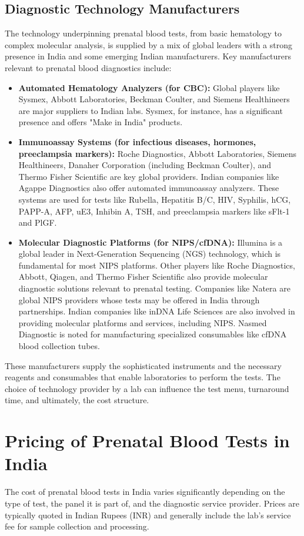 \documentclass{article}
\begin{document}
\subsection{Diagnostic Technology Manufacturers}
The technology underpinning prenatal blood tests, from basic hematology to complex molecular analysis, is supplied by a mix of global leaders with a strong presence in India and some emerging Indian manufacturers. Key manufacturers relevant to prenatal blood diagnostics include:
\begin{itemize}
    \item \textbf{Automated Hematology Analyzers (for CBC):} Global players like Sysmex, Abbott Laboratories, Beckman Coulter, and Siemens Healthineers are major suppliers to Indian labs. Sysmex, for instance, has a significant presence and offers "Make in India" products.
    \item \textbf{Immunoassay Systems (for infectious diseases, hormones, preeclampsia markers):} Roche Diagnostics, Abbott Laboratories, Siemens Healthineers, Danaher Corporation (including Beckman Coulter), and Thermo Fisher Scientific are key global providers. Indian companies like Agappe Diagnostics also offer automated immunoassay analyzers. These systems are used for tests like Rubella, Hepatitis B/C, HIV, Syphilis, hCG, PAPP-A, AFP, uE3, Inhibin A, TSH, and preeclampsia markers like sFlt-1 and PlGF.
    \item \textbf{Molecular Diagnostic Platforms (for NIPS/cfDNA):} Illumina is a global leader in Next-Generation Sequencing (NGS) technology, which is fundamental for most NIPS platforms. Other players like Roche Diagnostics, Abbott, Qiagen, and Thermo Fisher Scientific also provide molecular diagnostic solutions relevant to prenatal testing. Companies like Natera are global NIPS providers whose tests may be offered in India through partnerships. Indian companies like inDNA Life Sciences are also involved in providing molecular platforms and services, including NIPS. Nasmed Diagnostic is noted for manufacturing specialized consumables like cfDNA blood collection tubes.
\end{itemize}
These manufacturers supply the sophisticated instruments and the necessary reagents and consumables that enable laboratories to perform the tests. The choice of technology provider by a lab can influence the test menu, turnaround time, and ultimately, the cost structure.

\section{Pricing of Prenatal Blood Tests in India}
The cost of prenatal blood tests in India varies significantly depending on the type of test, the panel it is part of, and the diagnostic service provider. Prices are typically quoted in Indian Rupees (INR) and generally include the lab's service fee for sample collection and processing.
\end{document}

